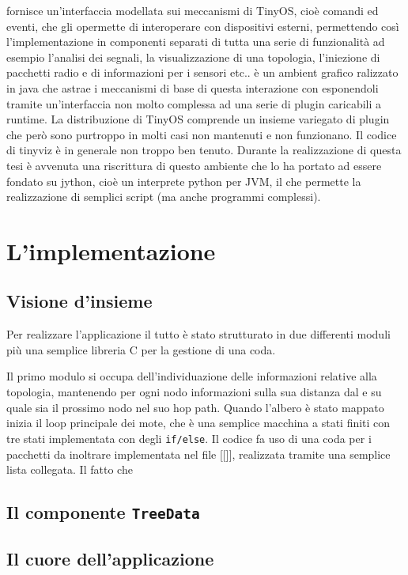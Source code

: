 \documentclass[pdftex,11pt,a4paper,italian,openany]{book}
\begin{document}
\tos fornisce un'interfaccia modellata sui meccanismi di TinyOS, cioè comandi ed eventi, 
che gli opermette di interoperare con dispositivi esterni, permettendo così l'implementazione in componenti separati di tutta una serie di funzionalità ad esempio l'analisi dei segnali, la visualizzazione di una topologia, l'iniezione di pacchetti radio e di informazioni per i sensori etc.. 
\tv è un ambient grafico ralizzato in java che astrae i meccanismi di base di questa interazione 
con \tos esponendoli tramite un'interfaccia non molto complessa ad una serie di plugin 
caricabili a runtime.  La distribuzione di TinyOS comprende un insieme variegato di plugin che 
però sono purtroppo in molti casi non mantenuti e non funzionano. Il codice di tinyviz è 
in generale non troppo ben tenuto. 
Durante la realizzazione di questa tesi è avvenuta una riscrittura di questo ambiente che lo ha 
portato ad essere fondato su jython\cite{tython}, cioè un interprete python per JVM, 
il che permette la realizzazione di semplici script (ma anche programmi complessi).
 

\chapter{L'implementazione}
\section{Visione d'insieme}
Per realizzare l'applicazione il tutto è stato strutturato in due differenti moduli più 
una semplice libreria C per la gestione di una coda.

Il primo modulo si occupa dell'individuazione delle informazioni relative alla topologia, 
mantenendo per ogni nodo informazioni sulla sua distanza dal \sink e su quale sia il prossimo 
nodo nel suo hop path.  
Quando l'albero è stato mappato inizia il loop principale dei mote, che è una 
semplice macchina a stati finiti con tre stati implementata con degli \texttt{if/else}.
Il codice fa uso di una coda per i pacchetti da inoltrare implementata nel file [[]], realizzata tramite una semplice lista collegata. Il fatto che 



\newcommand{\treedata}{\texttt{TreeData}}
\section{Il componente \treedata}



\section{Il cuore dell'applicazione}
\end{document}
